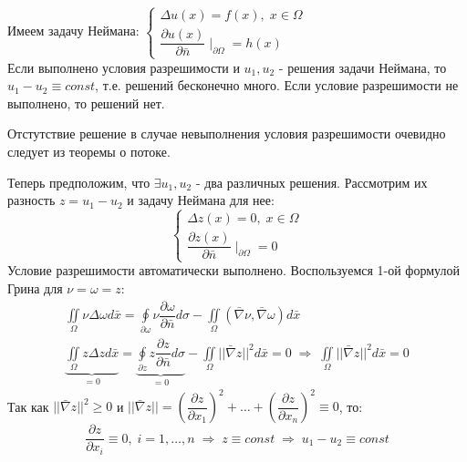 \begin{theorem}
	$\;$\\
	Имеем задачу Неймана: 
	$\begin{cases}
		\Delta u(x) = f(x), \; x \in \Omega \\
		\dfrac{\partial u(x)}{\partial \bar{n}} \mid_{\partial \Omega} = h(x)
	\end{cases}$\\
	Если выполнено условия разрешимости и
	$ u_1, u_2 $ - решения задачи Неймана, то $u_1 - u_2 \equiv const$, т.е. решений бесконечно много. Если условие разрешимости не выполнено, то решений нет.
\end{theorem}
\begin{Proof}
	Отстутствие решение в случае невыполнения условия разрешимости очевидно следует из теоремы о потоке.

	Теперь предположим, что 
	$\exists u_1, u_2 $ - два различных решения. Рассмотрим их разность $ z = u_1 - u_2 $ и задачу Неймана для нее:
	$$\begin{cases}
		\Delta z(x) = 0, \; x \in \Omega \\
		\dfrac{\partial z(x)}{\partial \bar{n}} \mid_{\partial \Omega} = 0
	\end{cases}$$
	Условие разрешимости автоматически выполнено. Воспользуемся 1-ой формулой Грина для $ \nu = \omega = z $:
	$$\begin{gathered}
		\iint\limits_{\Omega} \nu \Delta \omega d\bar{x} = \oint\limits_{\partial \omega} \nu \dfrac{\partial \omega}{\partial \bar{n}}d\sigma - \iint\limits_{\Omega}( \bar{\nabla} \nu, \bar{\nabla} \omega)d\bar{x} \\
		\underbrace{\iint\limits_{\Omega} z \Delta z d\bar{x}}_{= 0} = \underbrace{\oint\limits_{\partial z} z \dfrac{\partial z}{\partial \bar{n}}d\sigma}_{= 0} - \iint\limits_{\Omega}|| \bar{\nabla} z||^2d\bar{x} = 0 \; \Rightarrow \; \iint\limits_{\Omega}|| \bar{\nabla} z||^2d\bar{x} = 0
	\end{gathered}$$
	Так как $|| \bar{\nabla} z||^2 \geq 0$ и $|| \bar{\nabla} z|| = (\dfrac{\partial z}{\partial x_1})^2 + \dots + (\dfrac{\partial z}{\partial x_n})^2 \equiv 0$, то: 
	$$\dfrac{\partial z}{\partial x_i} \equiv 0, \; i = 1, \ldots, n \; \Rightarrow \;  z \equiv const \; \Rightarrow \;  u_1 - u_2 \equiv const$$
\end{Proof}











